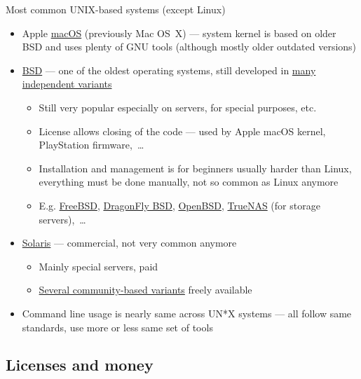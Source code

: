 \documentclass[compress, xelatex, 11pt, xcolor=svgnames, aspectratio=169,
	hyperref={
		bookmarks=true,
		unicode=true,
		colorlinks=true,
		pdftitle={Linux, command line and MetaCentrum},
		plainpages=false,
		pdfauthor={Vojtech Zeisek},
		pdfsubject={Course about use of Linux command line, writing shell scripts and using MetaCentrum of CESNET},
		pdfcreator={XeLaTeX},
		pdfkeywords={Linux, GNU, BASH, shell, command line, MetaCentrum},
		linkcolor=DarkRed, %
		anchorcolor=DarkBlue, %
		citecolor=Indigo, %
		filecolor=NavyBlue, %
		menucolor=DarkMagenta, %
		urlcolor=DarkBlue, %
		},
	url={hyphens, lowtilde} %
	]{beamer}
\begin{document}
\begin{frame}{Most common UNIX-based systems (except Linux)}
	\begin{itemize}
		\item Apple \href{https://en.wikipedia.org/wiki/macOS}{macOS} (previously Mac OS~X) --- system kernel is based on older BSD and uses plenty of GNU tools (although mostly older outdated versions)
		\item \href{https://en.wikipedia.org/wiki/Berkeley_Software_Distribution}{BSD} --- one of the oldest operating systems, still developed in \href{https://distrowatch.com/search.php?ostype=BSD}{many independent variants}
		\begin{itemize}
			\item Still very popular especially on servers, for special purposes, etc.
			\item License allows closing of the code --- used by Apple macOS kernel, PlayStation firmware,~\ldots
			\item Installation and management is for beginners usually harder than Linux, everything must be done manually, not so common as Linux anymore
			\item E.g. \href{https://www.freebsd.org/}{FreeBSD}, \href{https://www.dragonflybsd.org/}{DragonFly BSD}, \href{https://www.openbsd.org/}{OpenBSD}, \href{https://www.truenas.com/}{TrueNAS} (for storage servers),~\ldots
		\end{itemize}
		\item \href{https://en.wikipedia.org/wiki/Oracle_Solaris}{Solaris} --- commercial, not very common anymore
		\begin{itemize}
			\item Mainly special servers, paid
			\item \href{https://distrowatch.com/search.php?ostype=Solaris}{Several community-based variants} freely available
		\end{itemize}
		\item Command line usage is nearly same across UN*X systems --- all follow same standards, use more or less same set of tools
	\end{itemize}
\end{frame}

\subsection{Licenses and money}
\end{document}
